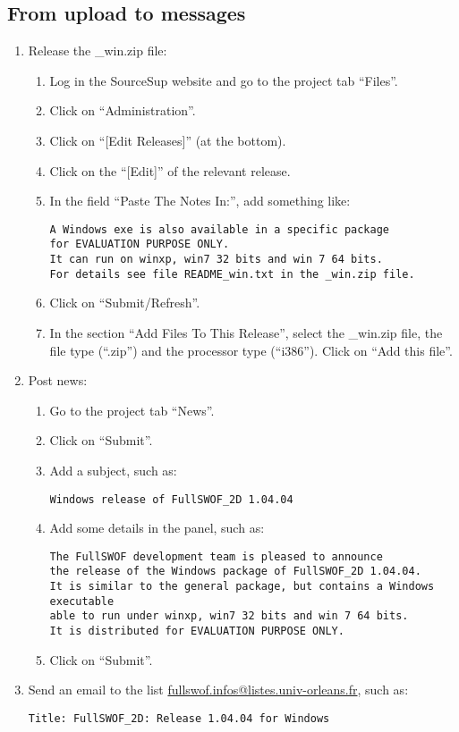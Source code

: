 \documentclass[a4paper, 11pt]{article}
\begin{document}
\subsection{From upload to messages}
\begin{enumerate}
\item Release the \_win.zip file:
\begin{enumerate}
\item Log in the SourceSup website and go to the project tab ``Files''.
\item Click on ``Administration''.
\item Click on ``[Edit Releases]'' (at the bottom).
\item Click on the ``[Edit]'' of the relevant release.
\item In the field ``Paste The Notes In:'', add something like:
\begin{verbatim}
A Windows exe is also available in a specific package 
for EVALUATION PURPOSE ONLY.
It can run on winxp, win7 32 bits and win 7 64 bits.
For details see file README_win.txt in the _win.zip file.
\end{verbatim}
\item Click on ``Submit/Refresh''.
\item In the section ``Add Files To This Release'', select the \_win.zip file,
the file type (``.zip'') and the processor type  (``i386''). Click on ``Add this file''.
\end{enumerate}
\item Post news:
\begin{enumerate}
\item Go to the project tab ``News''.
\item Click on ``Submit''.
\item Add a subject, such as:
\begin{verbatim}
Windows release of FullSWOF_2D 1.04.04
\end{verbatim}
\item Add some details in the panel, such as:
\begin{verbatim}
The FullSWOF development team is pleased to announce
the release of the Windows package of FullSWOF_2D 1.04.04.
It is similar to the general package, but contains a Windows executable 
able to run under winxp, win7 32 bits and win 7 64 bits.
It is distributed for EVALUATION PURPOSE ONLY.
\end{verbatim}
\item Click on ``Submit''.
\end{enumerate}
\item Send an email to the list
\href{mailto:fullswof.infos@listes.univ-orleans.fr}{fullswof.infos@listes.univ-orleans.fr}, such as:
\begin{verbatim}
Title: FullSWOF_2D: Release 1.04.04 for Windows


\end{verbatim}
\end{enumerate}
\end{document}
